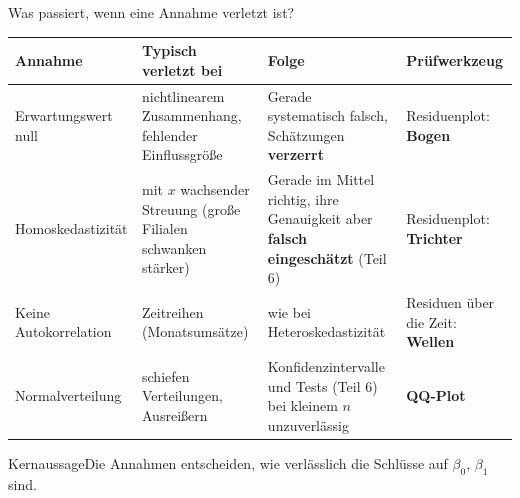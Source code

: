 \documentclass[aspectratio=169,11pt]{beamer}
\newcommand{\kernaussage}[1]{\begin{alertblock}{Kernaussage}#1\end{alertblock}}
\begin{document}
\begin{frame}{Was passiert, wenn eine Annahme verletzt ist?}
  \begin{center}
    \footnotesize
    \renewcommand{\arraystretch}{1.12}
    \begin{tabular}{@{}L{2.5cm} L{3.7cm} L{4.4cm} L{2.9cm}@{}}
      \toprule
      \textbf{Annahme} & \textbf{Typisch verletzt bei} & \textbf{Folge} & \textbf{Prüfwerkzeug} \\
      \midrule
      Erwartungswert null & nichtlinearem Zusammenhang, fehlender Einflussgröße
        & Gerade systematisch falsch, Schätzungen \textbf{verzerrt} & Residuenplot: \textbf{Bogen} \\
      Homo\-skedastizität & mit $x$ wachsender Streuung (große Filialen schwanken stärker)
        & Gerade im Mittel richtig, ihre Genauigkeit aber \textbf{falsch eingeschätzt} (Teil 6) & Residuenplot: \textbf{Trichter} \\
      Keine Auto\-korrelation & Zeitreihen (Monatsumsätze)
        & wie bei Heteroskedastizität & Residuen über die Zeit: \textbf{Wellen} \\
      Normal\-verteilung & schiefen Verteilungen, Ausreißern
        & Konfidenzintervalle und Tests (Teil 6) bei kleinem $n$ unzuverlässig & \textbf{QQ-Plot} \\
      \bottomrule
    \end{tabular}
  \end{center}

  \kernaussage{Die Annahmen entscheiden, wie verlässlich die Schlüsse auf $\beta_0$, $\beta_1$ sind.}
\end{frame}
\end{document}
